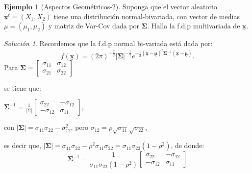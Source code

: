 \documentclass[
]{book}
\theoremstyle{definition}
\theoremstyle{definition}
\newtheorem{example}{Ejemplo}[chapter]
\theoremstyle{definition}
\theoremstyle{definition}
\theoremstyle{remark}
\newtheorem*{solution}{Solución}
\begin{document}
\begin{example}[Aspectos Geométricos-2]
\protect\hypertarget{exm:ejemplo-aspectos-geom-2}{}\label{exm:ejemplo-aspectos-geom-2}Suponga que el vector aleatorio \(\underline{\mathbf{x}}^t=(X_1,X_2)\) tiene una distribución normal-bivariada, con vector de medias \(\underline{\mu}=(\mu_1,\mu_2)\) y matriz de Var-Cov dada por \(\mathbf{\Sigma}\). Halla la f.d.p multivariada de \(\underline{\mathbf{x}}\).
\end{example}

\begin{solution}
Recordemos que la f.d.p normal bi-variada está dada por:
\[
f(\underline{\mathbf{x}})=(2\pi)^{-\frac{2}{2}}|\mathbf{\Sigma}|^{-\frac{1}{2}}e^{-\frac{1}{2}(\underline{\mathbf{x}}-\underline{\mathbf{\mu}})^t\mathbf{\Sigma}^{-1}(\underline{\mathbf{x}}-\underline{\mathbf{\mu}})}.
\]
Para \(\mathbf{\Sigma}=\begin{bmatrix} \sigma_{11} & \sigma_{12} \\ \sigma_{21} & \sigma_{22} \end{bmatrix}\)

se tiene que:

\(\mathbf{\Sigma}^{-1}=\frac{1}{|\Sigma|}\begin{bmatrix} \sigma_{22} & -\sigma_{12} \\ -\sigma_{12} &\sigma_{11} \end{bmatrix}\),

con \(|\mathbf{\Sigma}|=\sigma_{11}\sigma_{22}-\sigma_{12}^2\), pero \(\sigma_{12}=\rho \sqrt{\sigma_{11}}\sqrt{\sigma_{22}}\),

es decir que, \(|\mathbf{\Sigma}|=\sigma_{11}\sigma_{22}-\rho^2\sigma_{11}\sigma_{22}=\sigma_{11}\sigma_{22}(1-\rho^2)\), de donde:
\[
\mathbf{\Sigma}^{-1}=\frac{1}{\sigma_{11}\sigma_{22}(1-\rho^2)}\begin{bmatrix}
\sigma_{22} & -\sigma_{12} \\ -\sigma_{12} &\sigma_{11}
\end{bmatrix}
\]


\end{solution}
\end{document}
